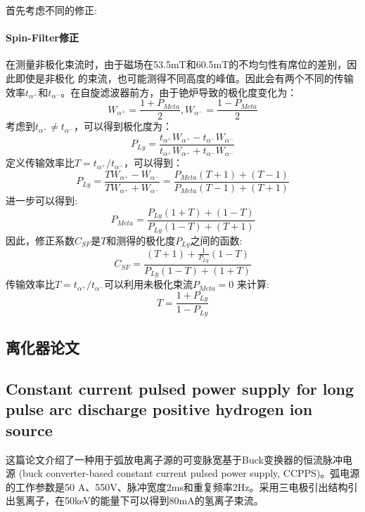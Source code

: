 \documentclass{article}
\numberwithin{equation}{subsection} %
\numberwithin{figure}{subsection} %
\numberwithin{table}{subsection} %
\begin{document}
首先考虑不同的修正:
\paragraph{Spin-Filter修正}
在测量非极化束流时，由于磁场在53.5mT和60.5mT的不均匀性有席位的差别，因此即使是非极化 的束流，也可能测得不同高度的峰值。因此会有两个不同的传输效率$t_{\alpha^{+}}$和$t_{\alpha^{-}}$。在自旋滤波器前方，由于铯炉导致的极化度变化为：
\begin{equation}
    W_{\alpha^{+}} = \frac{1+P_{Meta}}{2} , W_{\alpha^{-}} = \frac{1-P_{Meta}}{2}
\end{equation}
考虑到$t_{\alpha^{+}} \not= t_{\alpha^{-}}$，可以得到极化度为：
\begin{equation}
    P_{Ly} = \frac{t_{\alpha^{+}}W_{\alpha^{+}} - t_{\alpha^{-}}W_{\alpha^{-}}}{t_{\alpha^{+}}W_{\alpha^{+}} + t_{\alpha^{-}}W_{\alpha^{-}}}
\end{equation}  
定义传输效率比$T = t_{\alpha^{+}}/t_{\alpha^{-}}$，可以得到：
\begin{equation}
    P_{Ly} = \frac{TW_{\alpha^{+}} -W_{\alpha^{-}}}{ TW_{\alpha^{+}} + W_{\alpha^{-}}} = \frac{P_{Meta}(T+1)+(T-1)}{P_{Meta}(T-1)+(T+1)}
\end{equation}
进一步可以得到:
\begin{equation}
    P_{Meta} = \frac{P_{Ly}(1+T) + (1 - T)}{P_{Ly}(1-T) + (T+1)}
    \label{eq:spin_filter_equation}
\end{equation}
因此，修正系数$C_{SF}$是$T$和测得的极化度$P_{Ly}$之间的函数:
\begin{equation}
    C_{SF} = \frac{(T+1) + \frac{1}{P_{Ly}}(1 - T)}{P_{Ly}(1- T) + (1 + T)}
    \label{eq:spin_filter_coefficient_equation}
\end{equation}
传输效率比$T = t_{\alpha^{+}}/t_{\alpha^{-}}$可以利用未极化束流$P_{Meta} = 0$ 来计算:
\begin{equation}
    T = \frac{1 + P_{Ly}}{1 - P_{Ly}}
    \label{eq:transmission_efficiency_ratio_equation}
\end{equation}







\subsection*{离化器论文}


\subsection{Constant current pulsed power supply  for long pulse arc discharge positive  hydrogen ion source\cite{motwani_constant_2023}}
这篇论文介绍了一种用于弧放电离子源的可变脉宽基于Buck变换器的恒流脉冲电源 (buck converter-based constant current pulsed power supply, CCPPS)。弧电源的工作参数是50 A、550V、脉冲宽度2ms和重复频率2Hz。采用三电极引出结构引出氢离子，在50keV的能量下可以得到80mA的氢离子束流。
\end{document}
